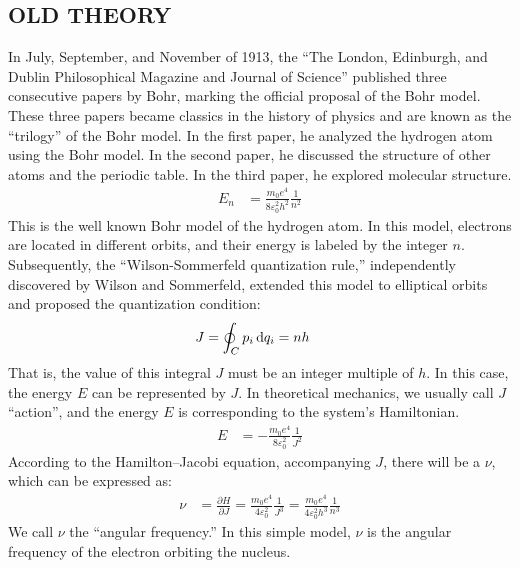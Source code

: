\documentclass[a4paper, 12pt, oneside, onecolumn]{article}
\newcommand{\cald}{{\rm d}}
\begin{document}
\begin{multicols}{2}
\section{OLD THEORY}
In July, September, and November of 1913, the ``The London, Edinburgh, and Dublin Philosophical Magazine and Journal of Science'' published three consecutive papers by Bohr\cite{doi:10.1080/14786441308634955}\cite{doi:10.1080/14786441308634993}\cite{doi:10.1080/14786441308635031}, marking the official proposal of the Bohr model. These three papers became classics in the history of physics and are known as the ``trilogy'' of the Bohr model\cite{bohr1985niels}. In the first paper, he analyzed the hydrogen atom using the Bohr model. In the second paper, he discussed the structure of other atoms and the periodic table. In the third paper, he explored molecular structure.
\begin{align}
	E_n
	&= \frac{m_0 e^4}{8 \varepsilon_0^2 h^2} \frac{1}{n^2}
\end{align}
This is the well known Bohr model of the hydrogen atom. In this model, electrons are located in different orbits, and their energy is labeled by the integer $n$. Subsequently, the ``Wilson-Sommerfeld quantization rule,'' independently discovered by Wilson\cite{wilsonquantum} and Sommerfeld\cite{https://doi.org/10.1002/andp.19163561702}, extended this model to elliptical orbits and proposed the quantization condition:
\begin{align}
	J
	&= \oint_C p_i \,\cald q_i = n h
\end{align}
That is, the value of this integral $J$ must be an integer multiple of $h$. In this case, the energy $E$ can be represented by $J$. In theoretical mechanics, we usually call $J$ ``action'', and the energy $E$ is corresponding to the system's Hamiltonian.
\begin{align}
	E
	&= - \frac{m_0 e^4}{8 \varepsilon_0^2} \frac{1}{J^2}
\end{align} 
According to the Hamilton–Jacobi equation, accompanying $J$, there will be a $\nu$, which can be expressed as:
\begin{align}
	\nu
	&= \frac{\partial H}{\partial J} = \frac{m_0 e^4}{4 \varepsilon_0^2} \frac{1}{J^3} = \frac{m_0 e^4}{4 \varepsilon_0^2 h^3} \frac{1}{n^3}\label{eq4}
\end{align}
We call $\nu$ the ``angular frequency.'' In this simple model, $\nu$ is the angular frequency of the electron orbiting the nucleus.


\end{multicols}
\end{document}
